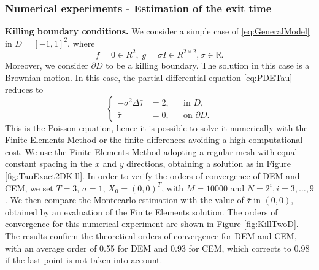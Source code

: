 \subsubsection{Numerical experiments - Estimation of the exit time}\label{sec:ExpTau2D}

\textbf{Killing boundary conditions.} We consider a simple case of \eqref{eq:GeneralModel} in $D = [-1,1]^2$, where
\begin{equation*}
	f = 0 \in R^2, \; g = \sigma I\in R^{2\times 2}, \sigma \in \mathbb{R}.
\end{equation*}
Moreover, we consider $\partial D$ to be a killing boundary. The solution in this case is a Brownian motion. In this case, the partial differential equation \eqref{eq:PDETau} reduces to
\begin{equation}\label{eq:PDETau2DKilling}
	\left \{
  	\begin{aligned}
	- \sigma^2 \Delta \bar \tau &= 2, && \text{in } D, \\
	\bar \tau &= 0, && \text{on } \partial D.
	\end{aligned} \right.
\end{equation}
This is the Poisson equation, hence it is possible to solve it numerically with the Finite Elements Method or the finite differences avoiding a high computational cost. We use the Finite Elements Method adopting a regular mesh with equal constant spacing in the $x$ and $y$ directions, obtaining a solution as in Figure \ref{fig:TauExact2DKill}. In order to verify the orders of convergence of DEM and CEM, we set $T = 3$, $\sigma = 1$, $X_0 = (0,0)^T$, with $M = 10000$ and $N = 2^i,i=3,\dots,9$. We then compare the Montecarlo estimation with the value of $\bar\tau$ in $(0,0)$, obtained by an evaluation of the Finite Elements solution. The orders of convergence for this numerical experiment are shown in Figure \ref{fig:KillTwoD}. The results confirm the theoretical orders of convergence for DEM and CEM, with an average order of 0.55 for DEM and 0.93 for CEM, which corrects to 0.98 if the last point is not taken into account.

